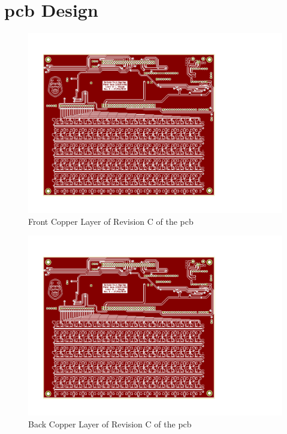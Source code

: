 \documentclass[12pt,a4paper]{report}
\begin{document}
\chapter{\ac{pcb} Design}
\begin{figure}[h!]
	\begin{center}
		\includegraphics[width = \textwidth, trim={0.69in 0.78in 3.1in 0.95in}, clip]{../Skripsie/PCB_27032019.pdf}
		\caption{Front Copper Layer of Revision C of the \ac{pcb}}
		\label{fig:frontpcb}
	\end{center}
\end{figure}
\begin{figure}[h!]
	\begin{center}
		\includegraphics[page=2, width = \textwidth, trim={0.69in 0.78in 3.1in 0.95in}, clip]{../Skripsie/PCB_27032019.pdf}
		\caption{Back Copper Layer of Revision C of the \ac{pcb}}
		\label{fig:backpcb}
	\end{center}
\end{figure}
\end{document}
